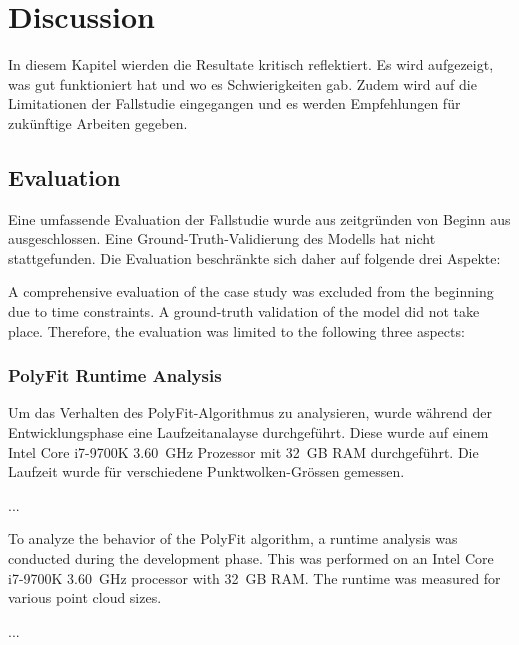 \chapter{Discussion}
\label{sec:discussion}

\begin{German}
    In diesem Kapitel wierden die Resultate kritisch reflektiert. Es wird aufgezeigt, was gut funktioniert hat und wo es Schwierigkeiten gab. Zudem wird auf die Limitationen der Fallstudie eingegangen und es werden Empfehlungen für zukünftige Arbeiten gegeben.
\end{German}

\section{Evaluation}
\begin{German}
    Eine umfassende Evaluation der Fallstudie wurde aus zeitgründen von Beginn aus ausgeschlossen. Eine Ground-Truth-Validierung des Modells hat nicht stattgefunden. Die Evaluation beschränkte sich daher auf folgende drei Aspekte:
\end{German}

\begin{English}
    A comprehensive evaluation of the case study was excluded from the beginning due to time constraints. A ground-truth validation of the model did not take place. Therefore, the evaluation was limited to the following three aspects:
\end{English}

\subsection{PolyFit Runtime Analysis}
\begin{German}
    Um das Verhalten des PolyFit-Algorithmus zu analysieren, wurde während der Entwicklungsphase eine Laufzeitanalayse durchgeführt. Diese wurde auf einem Intel Core i7-9700K 3.60~GHz Prozessor mit 32~GB RAM durchgeführt. Die Laufzeit wurde für verschiedene Punktwolken-Grössen gemessen.

    ...
\end{German}

\begin{English}
    To analyze the behavior of the PolyFit algorithm, a runtime analysis was conducted during the development phase. This was performed on an Intel Core i7-9700K 3.60~GHz processor with 32~GB RAM. The runtime was measured for various point cloud sizes.

    ...
\end{English}

